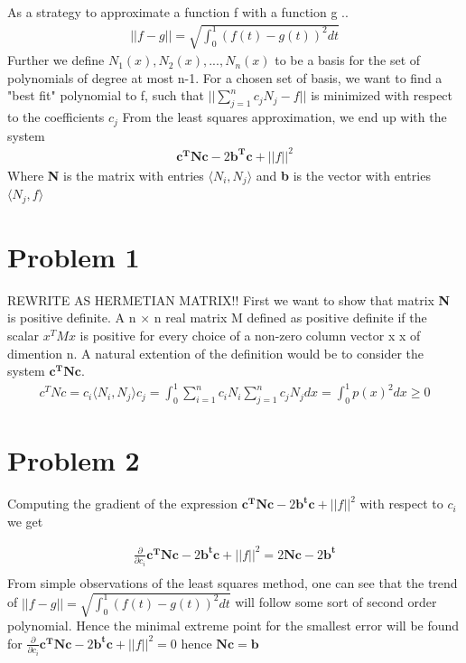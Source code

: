 \documentclass[a4paper,norsk]{article}
\begin{document}
\maketitle


As a strategy to approximate a function f with a function g ..  
\begin{align}
||f - g|| = \sqrt{\int_0^1 (f(t) - g(t) )^2 dt }	
\end{align} 
Further we define ${N_1(x), N_2(x), ..., N_n(x)}$ to be a basis for the set of polynomials of degree at most n-1. For a chosen set of basis, we want to 
find a "best fit" polynomial to f, such that $||\sum_{j=1}^n c_j N_j - f ||$ is minimized with respect to the coefficients $c_j$
From the least squares approximation, we end up with the system
\begin{align}
\mathbf{c^T N c} -2\mathbf{b^T c} + ||f||^2
\end{align}
Where \textbf{N} is the matrix with entries $\langle N_i, N_j \rangle$ and \textbf{b} is the vector with entries $\langle N_j, f \rangle$ 

\section*{Problem 1}
REWRITE AS HERMETIAN MATRIX!!
First we want to show that matrix \textbf{N} is positive definite.  A n × n real matrix M defined as positive definite if the scalar $ x^{T}M x$ is positive for every choice of a non-zero column vector x
x of dimention n. A natural extention of the definition would be to consider the system $\mathbf{c^TNc}$.
\begin{align}
c^TNc = c_i \langle N_i, N_j \rangle c_j = \int_0^1 \sum_{i=1}^n c_i N_i \sum_{j=1}^n c_j N_j dx = \int_0^1 p(x)^2 dx  \geq 0
\end{align}

\section*{Problem 2}
Computing the gradient of the expression $\mathbf{c^T N c} -2 \mathbf{b^t c} + ||f||^2 $ with respect to $c_i$ we get

\begin{align}
\frac{\partial}{\partial c_i} \mathbf{c^T N c} -2 \mathbf{b^t c} + ||f||^2 = 2\mathbf{Nc} - 2\mathbf{b^t} \\
\end{align}
From simple observations of the least squares method, one can see that the trend of $||f - g|| = \sqrt{\int_0^1 (f(t) - g(t) )^2 dt }$ will follow some sort of second order polynomial. Hence the minimal
extreme point for the smallest error will be found for $\frac{\partial}{\partial c_i} \mathbf{c^T N c} -2 \mathbf{b^t c} + ||f||^2 = 0$ hence $\mathbf{Nc} = \mathbf{b}$
\end{document}
